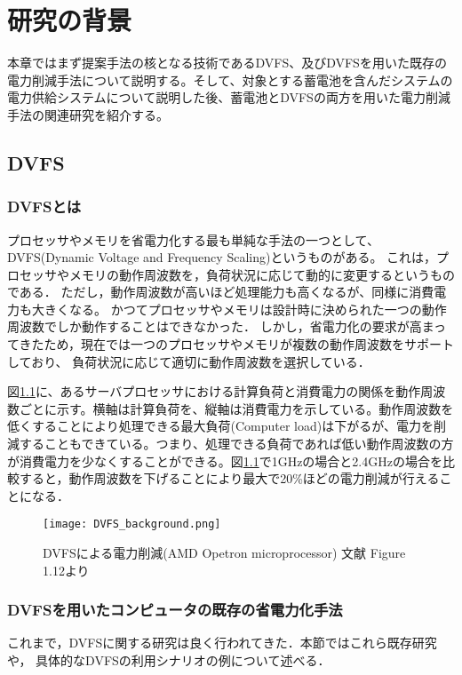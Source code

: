 \chapter{研究の背景}
\label{chap:background}

本章ではまず提案手法の核となる技術であるDVFS、及びDVFSを用いた既存の電力削減手法について説明する。そして、対象とする蓄電池を含んだシステムの電力供給システムについて説明した後、蓄電池とDVFSの両方を用いた電力削減手法の関連研究を紹介する。

\section{DVFS}
\label{sec:dvfs}

\subsection{DVFSとは}
プロセッサやメモリを省電力化する最も単純な手法の一つとして、DVFS(Dynamic Voltage and Frequency Scaling)というものがある。
これは，プロセッサやメモリの動作周波数を，負荷状況に応じて動的に変更するというものである．
ただし，動作周波数が高いほど処理能力も高くなるが、同様に消費電力も大きくなる。
かつてプロセッサやメモリは設計時に決められた一つの動作周波数でしか動作することはできなかった．
しかし，省電力化の要求が高まってきたため，現在では一つのプロセッサやメモリが複数の動作周波数をサポートしており、
負荷状況に応じて適切に動作周波数を選択している．


図\ref{fig:dvfs_background}に、あるサーバプロセッサにおける計算負荷と消費電力の関係を動作周波数ごとに示す\cite{Hennessy:2011:CAF:1999263}。横軸は計算負荷を、縦軸は消費電力を示している。動作周波数を低くすることにより処理できる最大負荷(Computer load)は下がるが、電力を削減することもできている。つまり、処理できる負荷であれば低い動作周波数の方が消費電力を少なくすることができる。図\ref{fig:dvfs_background}で1GHzの場合と2.4GHzの場合を比較すると，動作周波数を下げることにより最大で20\%ほどの電力削減が行えることになる．

\begin{figure}[t]
 \begin{center}
  \texttt{[image: DVFS\_background.png]}
 \end{center}
 \caption{DVFSによる電力削減(AMD Opetron microprocessor) 文献\cite{Hennessy:2011:CAF:1999263} Figure 1.12より}
 \label{fig:dvfs_background}
\end{figure}



\subsection{DVFSを用いたコンピュータの既存の省電力化手法}
これまで，DVFSに関する研究は良く行われてきた．本節ではこれら既存研究や，
具体的なDVFSの利用シナリオの例について述べる．


